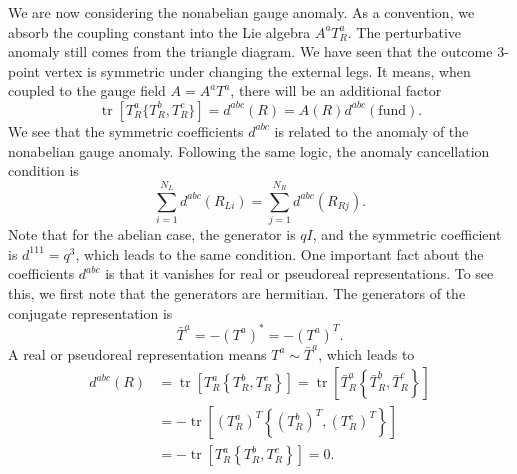 \documentclass[aps,prb,superscriptaddress,nofootinbib]{revtex4}
\def \tr{\operatorname{tr}}
\begin{document}
We are now considering the nonabelian gauge anomaly.
As a convention, we absorb the coupling constant into the Lie algebra $A^a T^a_R$.
The perturbative anomaly still comes from the triangle diagram.
We have seen that the outcome 3-point vertex is symmetric under changing the external legs.
It means, when coupled to the gauge field $A = A^a T^a$, there will be an additional factor
\begin{equation}
	\tr\left[T_R^a \{T_R^b, T_R^c\}\right] = d^{abc}(R) = A(R) d^{abc}(\text{fund}).
\end{equation}
We see that the symmetric coefficients $d^{abc}$ is related to the anomaly of the nonabelian gauge anomaly.
Following the same logic, the anomaly cancellation condition is
\begin{equation}
	\sum_{i=1}^{N_L} d^{abc}(R_{Li}) = \sum_{j=1}^{N_R} d^{abc}(R_{Rj}).
\end{equation}
Note that for the abelian case, the generator is $qI$, and the symmetric coefficient is $d^{111} = q^3$, which leads to the same condition.
One important fact about the coefficients $d^{abc}$ is that it vanishes for real or pseudoreal representations.
To see this, we first note that the generators are hermitian.
The generators of the conjugate representation is
\begin{equation}
	\bar T^a = - (T^{a})^* = - (T^{a})^T.
\end{equation}
A real or pseudoreal representation means $T^a \sim \bar T^a$, which leads to
\begin{equation}
\begin{aligned}
	d^{abc}(R) 
	&= \tr\left[T^a_R \left\{T^b_R, T^c_R \right\} \right] 
	= \tr\left[\bar T_R^a \left\{\bar T_R^b, \bar T_R^c \right\} \right] \\
	&= -\tr\left[(T_R^a)^T \left\{(T_R^b)^T,(T_R^c)^T \right\} \right] \\
	&= -\tr\left[T_R^a \left\{T_R^b,T_R^c \right\} \right] = 0.
\end{aligned}
\end{equation}
\end{document}
